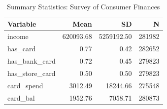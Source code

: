 \begin{table}
\centering
\caption{Summary Statistics: Survey of Consumer Finances}
\centering
\begin{tabular}[t]{lrrr}
\toprule
Variable & Mean & SD & N\\
\midrule
income & 620093.68 & 5259192.50 & 281982\\
has\_card & 0.77 & 0.42 & 282652\\
has\_bank\_card & 0.72 & 0.45 & 279823\\
has\_store\_card & 0.50 & 0.50 & 279823\\
card\_spend & 3012.49 & 18244.66 & 275548\\
\addlinespace
card\_bal & 1952.76 & 7058.71 & 280873\\
\bottomrule
\end{tabular}
\end{table}
